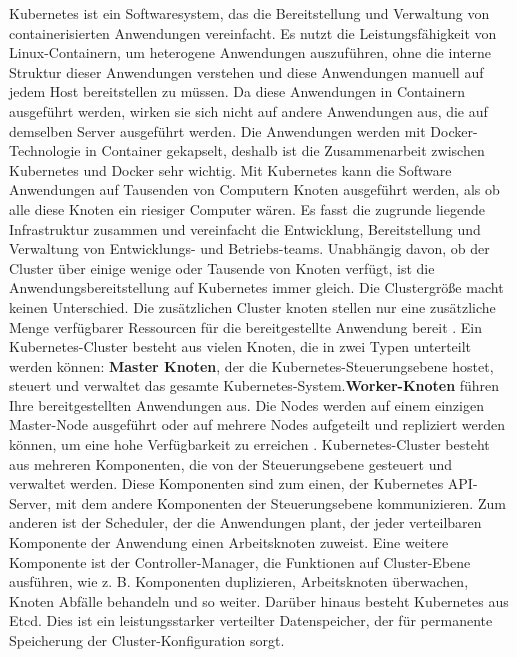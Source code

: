 Kubernetes ist ein Softwaresystem, das die Bereitstellung und Verwaltung von containerisierten Anwendungen vereinfacht. Es nutzt die Leistungsfähigkeit von Linux-Containern, um heterogene Anwendungen auszuführen, ohne die interne Struktur dieser Anwendungen verstehen und diese Anwendungen manuell auf jedem Host bereitstellen zu müssen. Da diese Anwendungen in Containern ausgeführt werden, wirken sie sich nicht auf andere Anwendungen aus, die auf demselben Server
ausgeführt werden. Die Anwendungen werden mit Docker-Technologie in Container
gekapselt, deshalb ist die Zusammenarbeit zwischen Kubernetes und Docker sehr wichtig. Mit Kubernetes kann die Software Anwendungen auf Tausenden von Computern Knoten ausgeführt werden, als ob alle diese Knoten ein riesiger Computer
wären. Es fasst die zugrunde liegende Infrastruktur zusammen und vereinfacht die Entwicklung, Bereitstellung und Verwaltung von Entwicklungs- und Betriebs-teams.
Unabhängig davon, ob der Cluster über einige wenige oder Tausende von Knoten verfügt, ist die Anwendungsbereitstellung auf Kubernetes immer gleich. Die Clustergröße macht keinen Unterschied. Die zusätzlichen Cluster knoten stellen nur
eine zusätzliche Menge verfügbarer Ressourcen für die bereitgestellte Anwendung
bereit \cite{kubernetes.io:concept}. 
\newline\newline
Ein Kubernetes-Cluster besteht aus vielen Knoten, die in zwei Typen unterteilt werden können: \textbf{Master Knoten}, der die Kubernetes-Steuerungsebene hostet, steuert und  verwaltet das gesamte Kubernetes-System.\textbf{Worker-Knoten} führen Ihre bereitgestellten Anwendungen aus. Die Nodes werden auf einem einzigen  Master-Node ausgeführt oder auf mehrere Nodes aufgeteilt und repliziert werden können, um eine hohe Verfügbarkeit zu erreichen \cite{kubernetes.io:concept}.
Kubernetes-Cluster besteht aus mehreren Komponenten, die von der Steuerungsebene gesteuert und verwaltet werden. Diese Komponenten sind zum einen, der Kubernetes API-Server, mit dem andere Komponenten der Steuerungsebene kommunizieren. Zum anderen ist der Scheduler, der die Anwendungen plant, der jeder verteilbaren Komponente der Anwendung einen Arbeitsknoten zuweist. Eine weitere Komponente ist der Controller-Manager, die Funktionen auf Cluster-Ebene ausführen, wie z. B. Komponenten duplizieren, Arbeitsknoten überwachen, Knoten Abfälle behandeln und
so weiter. Darüber hinaus besteht Kubernetes aus Etcd. Dies ist ein leistungsstarker verteilter Datenspeicher, der für permanente Speicherung der Cluster-Konfiguration
sorgt.

